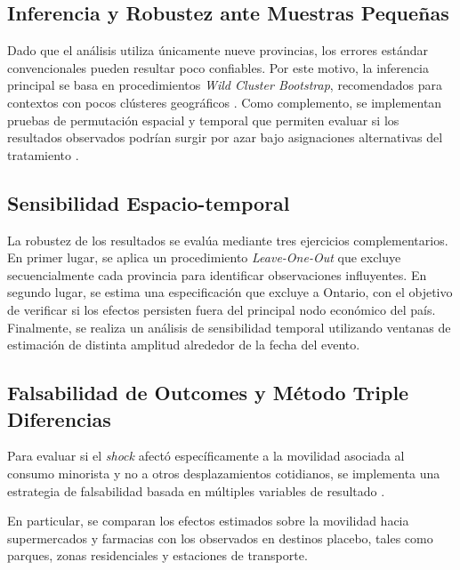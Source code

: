 \subsection{Inferencia y Robustez ante Muestras Peque\~nas}
\label{sec:4_4}

Dado que el an\'alisis utiliza \'unicamente nueve provincias, los errores est\'andar convencionales pueden resultar poco confiables. Por este motivo, la inferencia principal se basa en procedimientos \textit{Wild Cluster Bootstrap}, recomendados para contextos con pocos cl\'usteres geogr\'aficos \citep{moulton1990aggregate, webb2014reworking}. Como complemento, se implementan pruebas de permutaci\'on espacial y temporal que permiten evaluar si los resultados observados podr\'ian surgir por azar bajo asignaciones alternativas del tratamiento \citep{fisher1966design}.

\subsection{Sensibilidad Espacio-temporal}
\label{sec:4_6}

La robustez de los resultados se eval\'ua mediante tres ejercicios complementarios. En primer lugar, se aplica un procedimiento \textit{Leave-One-Out} que excluye secuencialmente cada provincia para identificar observaciones influyentes. En segundo lugar, se estima una especificaci\'on que excluye a Ontario, con el objetivo de verificar si los efectos persisten fuera del principal nodo econ\'omico del país. Finalmente, se realiza un an\'alisis de sensibilidad temporal utilizando ventanas de estimaci\'on de distinta amplitud alrededor de la fecha del evento.

\subsection{Falsabilidad de Outcomes y M\'etodo Triple Diferencias}
\label{sec:4_5}

Para evaluar si el \textit{shock} afect\'o espec\'ificamente a la movilidad asociada al consumo minorista y no a otros desplazamientos cotidianos, se implementa una estrategia de falsabilidad basada en m\'ultiples variables de resultado \citep{cunningham2021causal, angrist2009mostly, wooldridge2011econometric}.

En particular, se comparan los efectos estimados sobre la movilidad hacia supermercados y farmacias con los observados en destinos placebo, tales como parques, zonas residenciales y estaciones de transporte.

